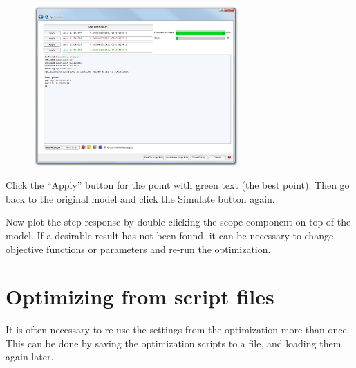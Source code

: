 \documentclass[a4paper,pdftex]{article}
\begin{document}
\begin{enumerate}
\FloatBarrier
\begin{figure}[htb]
\center
\includegraphics[width=0.7\textwidth]{gfx/optimization/screenshot-opt5c.png}
\end{figure}
\FloatBarrier

Click the \enquote{Apply} button for the point with green text (the best point). Then go back to the original model and click the Simulate button again.


Now plot the step response by double clicking the scope component on top of the model. If a desirable result has not been found, it can be necessary to change objective functions or parameters and re-run the optimization.

\end{enumerate}

\section*{Optimizing from script files}
It is often necessary to re-use the settings from the optimization more than once. This can be done by saving the optimization scripts to a file, and loading them again later.
\end{document}

